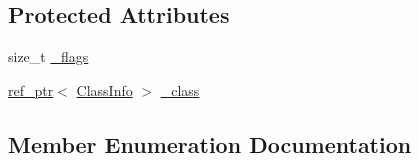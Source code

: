 \subsection*{Protected Attributes}
\begin{DoxyCompactItemize}
\item 
size\+\_\+t \hyperlink{classSLB_1_1InstanceBase_ae5ea147e7c548f9cd0f44884ed0a3c40}{\+\_\+flags}
\item 
\hyperlink{classSLB_1_1ref__ptr}{ref\+\_\+ptr}$<$ \hyperlink{classSLB_1_1ClassInfo}{Class\+Info} $>$ \hyperlink{classSLB_1_1InstanceBase_acb55084c9fe2f70d817f1a493fc09109}{\+\_\+class}
\end{DoxyCompactItemize}


\subsection{Member Enumeration Documentation}
